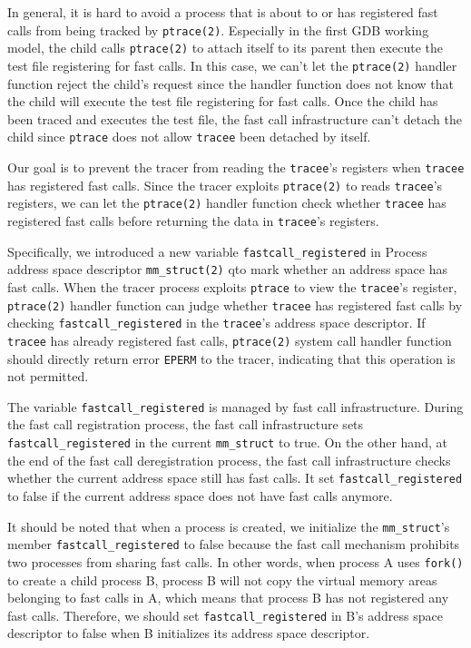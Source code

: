 In general, it is hard to avoid a process that is about to or has 
registered fast calls from being tracked by \verb|ptrace(2)|. Especially in the 
first GDB  working model, the child calls \verb|ptrace(2)| to attach itself 
to its parent then execute the test file registering for fast calls. 
In this case, we can't let the \verb|ptrace(2)| handler function reject the 
child's request since the handler function does not know that 
the child will execute the test file registering for fast calls. 
Once the child has been traced and executes the test file, the fast 
call infrastructure can't detach the child since \verb|ptrace| does not allow 
\verb|tracee| been detached by itself.

Our goal is to prevent the tracer from reading the 
\verb|tracee|'s registers when \verb|tracee| has registered fast calls. 
Since the tracer exploits \verb|ptrace(2)| to reads \verb|tracee|'s registers, 
we can let the \verb|ptrace(2)| handler function check whether \verb|tracee| has 
registered fast calls before returning the data in \verb|tracee|'s registers.


Specifically, we introduced a new variable \verb|fastcall_registered| 
in Process address space descriptor \verb|mm_struct(2)| qto mark whether an
address space has fast calls. When the tracer process exploits \verb|ptrace| 
to view the \verb|tracee|'s register, \verb|ptrace(2)| handler function can judge whether
\verb|tracee| has registered fast calls by checking \verb|fastcall_registered| in 
the \verb|tracee|'s address space descriptor. If \verb|tracee| has already 
registered fast calls, \verb|ptrace(2)| system call handler function should 
directly return error \verb|EPERM| to the tracer, indicating that this 
operation is not permitted.

The variable \verb|fastcall_registered| is managed by fast call 
infrastructure. During the fast call registration process,  
the fast call infrastructure sets \verb|fastcall_registered| in the current 
\verb|mm_struct| to true. On the other hand, at the end of the fast call 
deregistration process, the fast call infrastructure checks whether 
the current address space still has fast calls. It set \verb|fastcall_registered|  
to false if the current address space does not have fast calls anymore.

It should be noted that when a process is created, we initialize 
the \verb|mm_struct|'s member \verb|fastcall_registered|  to false because 
the fast call mechanism prohibits two processes from sharing fast calls.
 In other words, when process A uses \verb|fork()| to create a child process B, 
 process B will not copy the virtual memory areas belonging to fast calls in A, 
 which means that process B has not registered any fast calls. 
 Therefore, we should set \verb|fastcall_registered|  in B's address space 
 descriptor to false when B initializes its address space descriptor.

